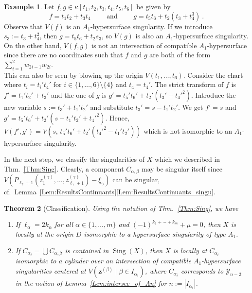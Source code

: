 \documentclass[letter,11pt]{amsart}
\DeclareMathOperator{\Sing}{Sing}
\newcommand{\z}{\boldsymbol{z}}
\newcommand{\XX}{X}
\theoremstyle{theorem}
\newtheorem{Thm}{Theorem}[section]         %
\theoremstyle{definition}
\newtheorem{example}[Thm]{Example}
\newcommand{\len}{\ell}
\numberwithin{equation}{section}
\begin{document}
\begin{example}
	\label{Ex:not-compatible-A1}
	Let $ f,g \in \kappa[t_1, t_2, t_3, t_4, t_5, t_6] $ be given by 
	\[ 
	f = t_1 t_2 + t_3 t_4 
	\qquad 
	\mbox{ and } 
	\qquad 
	g = t_5 t_6 + t_2 (t_3 + t_4^3 ) 
	\ .
	\] 
	Observe that $ V(f) $ is an $ A_1 $-hypersurface singularity.
	If we introduce $ s_3 := t_3 + t_4^2 $, then $ g = t_5 t_6 + t_2 s_3 $,
	so $ V (g) $ is also an $ A_1 $-hypersurface singularity.
	On the other hand, $ V (f,g) $ is not an intersection of compatible $ A_1 $-hypersurface since there are no coordinates such that 
	$ f $ and $ g $ are both of the form $ \sum_{i=1}^2 w_{2i-1} w_{2i} $.
	\\  
	This can also be seen by blowing up the origin $ V (t_1, \ldots, t_6 ) $.
	Consider the chart where $ t_i = t_i' t_4' $ for $ i \in \{ 1 , \ldots, 6 \} \setminus \{4\} $ and $ t_4 = t_4' $.
	The strict transform of $ f $ is $ f' = t_1' t_2' + t_3' $
	and the one of $ g $ is $ g' = t_5' t_6' + t_2' (t_3' + t_4'^2) $.
	Introduce the new variable $ s := t_3' + t_1' t_2' $ and substitute $ t_3' = s - t_1' t_2' $.
	We get $ f' = s $ 
	and $ g' = t_5' t_6' + t_2' (s -t_1't_2' + t_4'^2) $. 
	Hence, $ V (f',g') = V(s,\, t_5' t_6' + t_2' (t_4'^2 -t_1't_2')) $
	which is not isomorphic to an $ A_1 $-hypersurface singularity.  
\end{example}


In the next step, we classify the singularities of $ \XX $ 
which we described in Thm.~\ref{Thm:Sing}.
Clearly, a component 
$ C_{\alpha,\beta} $ may be singular itself 
since $ V ( P_{\len_\gamma +1} ( z_1^{(\gamma)}, \ldots, z_{\len_\gamma + 1}^{(\gamma)} ) 
- \xi_\gamma  ) $ can be singular, cf.~Lemma~\ref{Lem:ResultsContinuants}\eqref{Lem:ResultsContinuants_singu}.

\begin{Thm}[Classification]
	\label{Thm:ClassSing} 
	Using the notation of Thm.~\ref{Thm:Sing}, we have \
	\begin{enumerate}[(1)]
		\item 
		\label{it:origin}
		If $ \ell_\alpha = 2 k_\alpha $ for all $ \alpha \in \{ 1, \ldots, m \} $
		and $ (-1)^{k_1 + \cdots + k_m} + \mu = 0 $,
		then $ \XX $ is locally at the origin $ D $ isomorphic to a hypersurface singularity of type $ A_1 $. 
		
		\item 
		\label{it:c_i}
		If $ C_{\alpha_i} = \bigcup C_{\alpha,\beta} $ is contained in $ \Sing(X) $,
		then $ X $ is locally at $ C_{\alpha_i} $ isomorphic to a cylinder over an intersection of compatible $ A_1 $-hypersurface singularities centered at $ V ( \z^{(\beta)} \mid \beta \in I_{\alpha_i} ) $,
		where $ C_{\alpha_i} $ corresponds to $ \mathcal{Y}_{n-2} $ in the notion of Lemma~\ref{Lem:intersec_of_An} for $ n := |I_{\alpha_i}| $.
	\end{enumerate}
\end{Thm}
\end{document}
